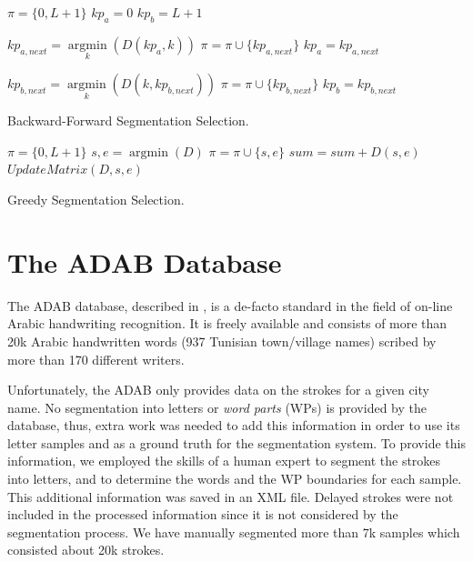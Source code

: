 \documentclass[10pt, conference, compsocconf]{IEEEtran}
\begin{document}
\begin{algorithm}
$\pi = \{0,L+1\}$\;
$kp_{a}=0$\;
$kp_{b}=L+1$\;
{
	$kp_{a,next} = \mathop {\arg \min}\limits_k (D(kp_a,k))$\;
	$\pi = \pi \cup \{kp_{a,next}\}$\;
	$kp_{a}=kp_{a,next}$\;
	
	$kp_{b,next} = \mathop {\arg \min}\limits_k (D(k,kp_{b,next}))$\;
	$\pi = \pi \cup \{kp_{b,next}\}$\;	
	$kp_{b}=kp_{b,next}$\;
}
\caption{Backward-Forward Segmentation Selection.}
\label{alg:bfss}
\end{algorithm}

\begin{algorithm}
$\pi = \{0,L+1\}$\;
{
	${s,e} = \mathop {\arg \min}(D)$\;
	$\pi = \pi \cup \{s,e\}$\;
	$sum = sum + D(s,e)$\;
	$UpdateMatrix(D,s,e)$\;
}
\caption{Greedy Segmentation Selection.}
\label{alg:gss}
\end{algorithm}

\section{The ADAB Database}
\label{sec:database}
The ADAB database, described in \cite{el2009icdar}, is a de-facto standard in the field of on-line Arabic handwriting recognition. 
It is freely available and consists of more than 20k Arabic handwritten words (937 Tunisian town/village names) scribed by more than 170 different writers. 

Unfortunately, the ADAB only provides data on the strokes for a given city name. 
No segmentation into letters or \emph{word parts} (WPs) is provided by the database, thus, extra work was needed to add this information in order to use its letter samples and as a ground truth for the segmentation system.
To provide this information, we employed the skills of a human expert to segment the strokes into letters, and to determine the words and the WP boundaries for each sample. 
This additional information was saved in an XML file. 
Delayed strokes were not included in the processed information since it is not considered by the segmentation process.
We have manually segmented more than 7k samples which consisted about 20k strokes. 

\end{document}
